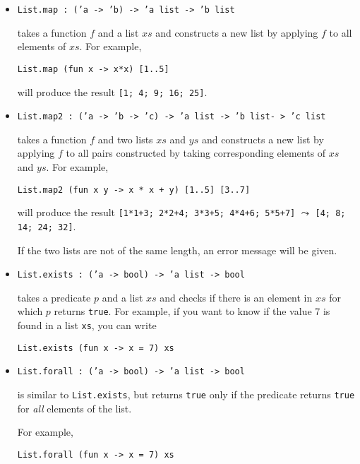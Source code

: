\documentclass[a4paper]{article}
\begin{document}
\begin{itemize}
\item \texttt{List.map : ('a -> 'b) -> 'a list -> 'b list}

takes a function $f$ and a list $xs$ and constructs a new list by
applying $f$ to all elements of $xs$.  For example,

\begin{verbatim}
List.map (fun x -> x*x) [1..5]
\end{verbatim}

\noindent
will produce the result \texttt{[1; 4; 9; 16; 25]}.

\item \texttt{List.map2 : ('a -> 'b -> 'c) -> 'a list -> 'b list- > 'c list}

takes a function $f$ and two lists $xs$ and $ys$ and constructs a new
list by applying $f$ to all pairs constructed by taking corresponding
elements of $xs$ and $ys$.  For example,

\begin{verbatim}
List.map2 (fun x y -> x * x + y) [1..5] [3..7]
\end{verbatim}

\noindent
will produce the result \texttt{[1*1+3; 2*2+4; 3*3+5; 4*4+6; 5*5+7]}
$\leadsto$ \texttt{[4; 8; 14; 24; 32]}.

If the two lists are not of the same length, an error message will be
given.


\item \texttt{List.exists : ('a -> bool) -> 'a list -> bool}

takes a predicate $p$ and a list $xs$ and checks if there is an
element in $xs$ for which $p$ returns \texttt{true}.  For example, if
you want to know if the value 7 is found in a list \texttt{xs}, you
can write 

\begin{verbatim}
List.exists (fun x -> x = 7) xs
\end{verbatim}


\item \texttt{List.forall : ('a -> bool) -> 'a list -> bool}

is similar to \texttt{List.exists}, but returns \texttt{true} only if
the predicate returns \texttt{true} for \emph{all} elements of the
list.

For example,


\begin{verbatim}
List.forall (fun x -> x = 7) xs
\end{verbatim}


\end{itemize}
\end{document}

